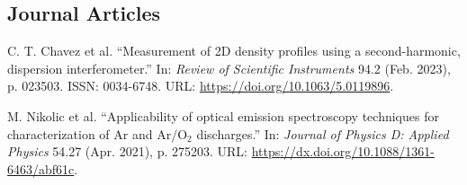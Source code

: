 \subsection*{Journal Articles}
\vspace{-1.5mm}

\begin{enumerate}[label={[\arabic*]}, leftmargin=*]
	\item C. T. Chavez et al. 
	``Measurement of 2D density profiles using a second-harmonic, dispersion interferometer.'' 
	In: \textit{Review of Scientific Instruments} 94.2 (Feb. 2023), p. 023503. 
	ISSN: 0034-6748. 
	URL: \href{https://doi.org/10.1063/5.0119896}{https://doi.org/10.1063/5.0119896}.
		\vspace{-3mm} %
	\item M. Nikolic et al. 
	``Applicability of optical emission spectroscopy techniques for characterization of Ar and Ar/O$_2$ discharges.'' 
	In: \textit{Journal of Physics D: Applied Physics} 54.27 (Apr. 2021), p. 275203. 
	URL: \href{https://dx.doi.org/10.1088/1361-6463/abf61c}{https://dx.doi.org/10.1088/1361-6463/abf61c}.
\end{enumerate}
